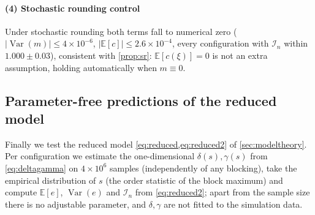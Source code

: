 \documentclass[twocolumn,review,hidelinks,oneeqnum,onetabnum,onefignum,onethmnum]{siamart251216}
\begin{document}
\paragraph{(4) Stochastic rounding control} Under stochastic rounding both terms
fall to numerical zero ($|\operatorname{Var}(m)|\le4\times10^{-6}$,
$|\mathbb{E}[c]|\le2.6\times10^{-4}$, every configuration with $\mathcal I_n$
within $1.000\pm0.03$), consistent with \cref{prop:sr}: $\mathbb{E}[c(\xi)]=0$ is
not an extra assumption, holding automatically when $m\equiv0$.

\subsection{Parameter-free predictions of the reduced model}
\label{sec:model}

Finally we test the reduced model \cref{eq:reduced,eq:reduced2} of
\cref{sec:modeltheory}. Per configuration we estimate the one-dimensional
$\delta(s),\gamma(s)$ from \cref{eq:deltagamma} on $4\times10^6$ samples
(independently of any blocking), take the empirical distribution of $s$ (the
order statistic of the block maximum) and compute $\mathbb{E}[e]$,
$\operatorname{Var}(e)$ and $\mathcal I_n$ from \cref{eq:reduced2}; apart from
the sample size there is no adjustable parameter, and $\delta,\gamma$ are not
fitted to the simulation data.
\end{document}
